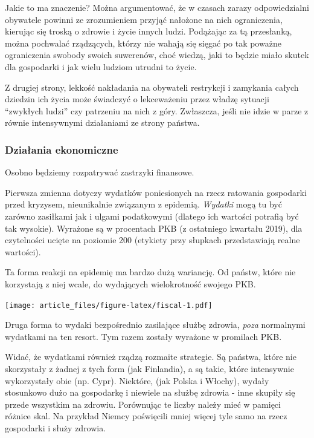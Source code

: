 \documentclass[
]{article}
\begin{document}
Jakie to ma znaczenie? Można argumentować, że w czasach zarazy
odpowiedzialni obywatele powinni ze zrozumieniem przyjąć nałożone na
nich ograniczenia, kierując się troską o zdrowie i życie innych ludzi.
Podążając za tą przesłanką, można pochwalać rządzących, którzy nie
wahają się sięgać po tak poważne ograniczenia swobody swoich suwerenów,
choć wiedzą, jaki to będzie miało skutek dla gospodarki i jak wielu
ludziom utrudni to życie.

Z drugiej strony, lekkość nakładania na obywateli restrykcji i zamykania
całych dziedzin ich życia może świadczyć o lekceważeniu przez władzę
sytuacji ``zwykłych ludzi'' czy patrzeniu na nich z góry. Zwłaszcza,
jeśli nie idzie w parze z równie intensywnymi działaniami ze strony
państwa.

\hypertarget{dziaux142ania-ekonomiczne}{%
\subsubsection{Działania ekonomiczne}\label{dziaux142ania-ekonomiczne}}

Osobno będziemy rozpatrywać zastrzyki finansowe.

Pierwsza zmienna dotyczy wydatków poniesionych na rzecz ratowania
gospodarki przed kryzysem, nieunikalnie związanym z epidemią.
\emph{Wydatki} mogą tu być zarówno zasiłkami jak i ulgami podatkowymi
(dlatego ich wartości potrafią być tak wysokie). Wyrażone są w
procentach PKB (z ostatniego kwartału 2019), dla czytelności ucięte na
poziomie 200 (etykiety przy słupkach przedstawiają realne wartości).

Ta forma reakcji na epidemię ma bardzo dużą wariancję. Od państw, które
nie korzystają z niej wcale, do wydających wielokrotność swojego PKB.

\texttt{[image: article\_files/figure-latex/fiscal-1.pdf]}

Druga forma to wydaki bezpośrednio zasilające służbę zdrowia,
\emph{poza} normalnymi wydatkami na ten resort. Tym razem zostały
wyrażone w promilach PKB.

Widać, że wydatkami również rządzą rozmaite strategie. Są państwa, które
nie skorzystały z żadnej z tych form (jak Finlandia), a są takie, które
intensywnie wykorzystały obie (np. Cypr). Niektóre, (jak Polska i
Włochy), wydały stosunkowo dużo na gospodarkę i niewiele na służbę
zdrowia - inne skupiły się przede wszystkim na zdrowiu. Porównując te
liczby należy mieć w pamięci różnice skal. Na przykład Niemcy poświęcili
mniej więcej tyle samo na rzecz gospodarki i służy zdrowia.
\end{document}
